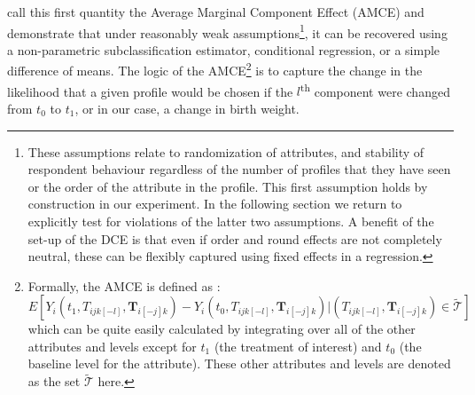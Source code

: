 \documentclass[a4paper, 11pt]{article}
\begin{document}
\begin{spacing}{1.4}
\citet{Hainmuelleretal2013} call this first quantity the Average Marginal
Component Effect (AMCE) and demonstrate that under reasonably weak
assumptions\footnote{These assumptions relate to randomization of attributes,
  and stability of respondent behaviour regardless of the number of profiles
  that they have seen or the order of the attribute in the profile.  This
  first assumption holds by construction in our experiment.  In the following
  section we return to explicitly test for violations of the latter two
  assumptions.  A benefit of the set-up of the DCE is that even if order and
  round effects are not completely neutral, these can be flexibly captured
  using fixed effects in a regression.}, it can be recovered using a
non-parametric subclassification
estimator, conditional regression, or a simple difference of means.  The
logic of the AMCE\footnote{Formally, the AMCE is defined as
  \citep{Hainmuelleretal2013}:
  \[
  E[Y_i(t_1,T_{ijk[-l]},\mathbf{T}_{i[-j]k})-Y_i(t_0,T_{ijk[-l]},\mathbf{T}_{i[-j]k})|(T_{ijk[-l]},\mathbf{T}_{i[-j]k})\in\tilde{\mathcal{T}}]
  \]
  which can be quite easily calculated by integrating over all of the other
  attributes and levels except for $t_1$ (the treatment of interest) and $t_0$
  (the baseline level for the attribute). These other attributes and levels are
  denoted as the set $\tilde{\mathcal{T}}$ here.} is to capture the change in
the likelihood that a given profile would be chosen if the
$l$\textsuperscript{th} component were changed from $t_0$ to $t_1$, or in our
case, a change in birth weight.


\end{spacing}
\end{document}
